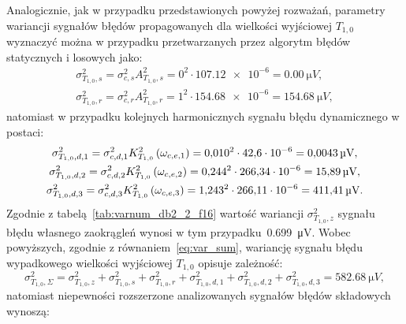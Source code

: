 Analogicznie, jak w przypadku przedstawionych powyżej rozważań, parametry wariancji sygnałów błędów propagowanych dla wielkości wyjściowej $T_{1,0}$ wyznaczyć można w przypadku przetwarzanych przez algorytm błędów statycznych i losowych jako:
\begin{gather}
\sigma_{T_{1,0},s}^{2} = \sigma_{c,s}^{2} A_{T_{1,0},s}^{2} = 0^{2} \cdot \num{107.12e-6} = \qty{0.00}{\micro V} \label{eq:sym_partd_output_var_stat_T_1_0}, \\
\sigma_{T_{1,0},r}^{2} = \sigma_{c,r}^{2} A_{T_{1,0},r}^{2} = 1^{2} \cdot \num{154.68e-6} = \qty{154.68}{\micro V} \label{eq:sym_partd_output_var_rand_T_1_0},
\end{gather}
natomiast w przypadku kolejnych harmonicznych sygnału błędu dynamicznego w postaci:
\begin{gather}
\sigma_{T_{1,0},d,1}^{2} = \sigma_{c,d,1}^{2} K_{T_{1,0}}^{2} \left(\omega_{c,e,1}\right) = \num{0.010}^{2} \cdot \num{42.6e-6} = \qty{0.0043}{\micro V} \label{eq:sym_partd_output_var_dyn_1_T_1_0}, \\
\sigma_{T_{1,0},d,2}^{2} = \sigma_{c,d,2}^{2} K_{T_{1,0}}^{2} \left(\omega_{c,e,2}\right) = \num{0.244}^{2} \cdot \num{266.34e-6} = \qty{15.89}{\micro V} \label{eq:sym_partd_output_var_dyn_2_T_1_0}, \\
\sigma_{T_{1,0},d,3}^{2} = \sigma_{c,d,3}^{2} K_{T_{1,0}}^{2} \left(\omega_{c,e,3}\right) = \num{1.243}^{2} \cdot \num{266.11e-6} = \qty{411.41}{\micro V} \label{eq:sym_partd_output_var_dyn_3_T_1_0}.
\end{gather}
Zgodnie z tabelą~\ref{tab:varnum_db2_2_f16} wartość wariancji $\sigma_{T_{1,0},z}^{2}$ sygnału błędu własnego zaokrągleń wynosi w tym przypadku~\qty{0.699}{\micro V}. Wobec powyższych, zgodnie z równaniem~\eqref{eq:var_sum}, wariancję sygnału błędu wypadkowego wielkości wyjściowej $T_{1,0}$ opisuje zależność:
\begin{equation}
\sigma_{T_{1,0},\Sigma}^{2} = \sigma_{T_{1,0},z}^{2} + \sigma_{T_{1,0},s}^{2} + \sigma_{T_{1,0},r}^{2} + \sigma_{T_{1,0},d,1}^{2} + \sigma_{T_{1,0},d,2}^{2} + \sigma_{T_{1,0},d,3}^{2} = \qty{582.68}{\micro V} \label{eq:sym_partd_output_var_sum_T_1_0},
\end{equation}
natomiast niepewności rozszerzone analizowanych sygnałów błędów składowych wynoszą:
